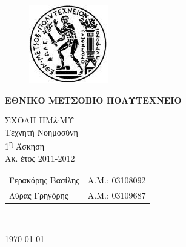 \begin{titlepage}
\begin{center}
\begin{figure}[t]
     \includegraphics[scale=0.7]{title/ntua_logo}
\end{figure}
\begin{LARGE}\textbf{ΕΘΝΙΚΟ ΜΕΤΣΟΒΙΟ ΠΟΛΥΤΕΧΝΕΙΟ\\}\end{LARGE}
\vspace{2cm}
\begin{Large}
ΣΧΟΛΗ ΗΜ\&ΜΥ\\
Τεχνητή Νοημοσύνη\\
1\textsuperscript{η} Άσκηση\\
Ακ. έτος 2011-2012\\
\end{Large}
\vspace{5cm}
\vspace{1cm}
\begin{tabular}{l r}
\Large{Γερακάρης Βασίλης}&
\large{Α.Μ.: 03108092}\\
\Large{Λύρας Γρηγόρης}&
\large{Α.Μ.: 03109687}\\
\end{tabular}\\
\vspace{5cm}

\vfill
\large\today\\
\end{center}
\end{titlepage}

